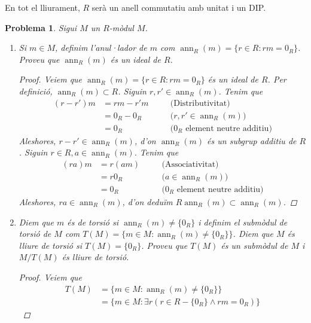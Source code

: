 \documentclass[compress]{article}
\newtheorem{problema}{Problema}
\theoremstyle{definition}
\DeclareMathOperator{\ann}{ann}
\begin{document}
\pagestyle{fancy}
En tot el lliurament, $R$ serà un anell commutatiu amb unitat i un DIP.
\begin{problema}
    Sigui $M$ un $R$-mòdul $M$.
    \begin{enumerate}
        \item Si $m\in M$, definim l'anul·lador de $m$ com $\ann_{R}(m)=\{r\in R:rm=0_{R}\}$. Proveu que $\ann_{R}(m)$ és un ideal de $R$.
        \begin{proof}
            Veiem que $\ann_{R}(m)=\{r\in R:rm=0_{R}\}$ és un ideal de $R$. Per definició, $\ann_{R}(m)\subset R$. Siguin $r,r'\in\ann_{R}(m)$. Tenim que
            \begin{align*}
                (r-r')m
                &=rm-r'm
                &\quad&\textrm{(Distributivitat)}\\
                &=0_{R}-0_{R}
                &\quad&\textrm{($r,r'\in\ann_{R}(m)$)}\\
                &=0_{R}
                &\quad&\textrm{($0_{R}$ element neutre additiu)}
            \end{align*}
            Aleshores, $r-r'\in\ann_{R}(m)$, d'on $\ann_{R}(m)$ és un subgrup additiu de $R$. Siguin $r\in R,a\in\ann_{R}(m)$. Tenim que
            \begin{align*}
                (ra)m
                &=r(am)
                &\quad&\textrm{(Associativitat)}\\
                &=r0_{R}
                &\quad&\textrm{($a\in\ann_{R}(m)$)}\\
                &=0_{R}
                &\quad&\textrm{($0_{R}$ element neutre additiu)}
            \end{align*}
            Aleshores, $ra\in\ann_{R}(m)$, d'on deduïm $R\ann_{R}(m)\subset\ann_{R}(m)$.
        \end{proof}
        \item Diem que $m$ és de torsió si $\ann_{R}(m)\neq\{0_{R}\}$ i definim el submòdul de torsió de $M$ com $T(M)=\{m\in M:\ann_{R}(m)\neq\{0_{R}\}\}$. Diem que $M$ és lliure de torsió si $T(M)=\{0_{R}\}$. Proveu que $T(M)$ és un submòdul de $M$ i $M/T(M)$ és lliure de torsió.
        \begin{proof}
            Veiem que
            \begin{align*}
                T(M)
                &=\{m\in M:\ann_{R}(m)\neq\{0_{R}\}\}\\
                &=\{m\in M:\exists r(r\in R-\{0_{R}\}\land rm=0_{R})\}
            \end{align*}

\end{proof}
\end{enumerate}
\end{problema}
\end{document}
